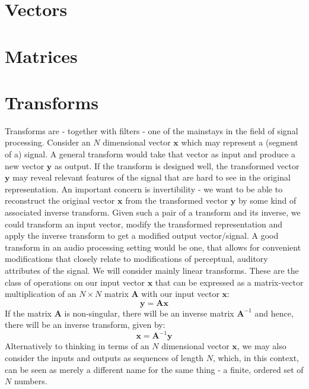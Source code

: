 \section{Vectors}
\section{Matrices}

\section{Transforms}
Transforms are - together with filters - one of the mainstays in the field of signal processing. Consider an $N$ dimensional vector $\mathbf{x}$ which may represent a (segment of a) signal. A general transform would take that vector as input and produce a new vector $\mathbf{y}$ as output. If the transform is designed well, the transformed vector $\mathbf{y}$ may reveal relevant features of the signal that are hard to see in the original representation. An important concern is invertibility - we want to be able to reconstruct the original vector $\mathbf{x}$ from the transformed vector $\mathbf{y}$ by some kind of associated inverse transform. Given such a pair of a transform and its inverse, we could transform an input vector, modify the transformed representation and apply the inverse transform to get a modified output vector/signal. A good transform in an audio processing setting would be one, that allows for convenient modifications that closely relate to modifications of perceptual, auditory attributes of the signal. We will consider mainly linear transforms. These are the class of operations on our input vector $\mathbf{x}$ that can be expressed as a matrix-vector multiplication of an  $N \times N$ matrix $\mathbf{A}$ with our input vector $\mathbf{x}$:
\begin{equation}
	\mathbf{y} = \mathbf{A} \mathbf{x}
\end{equation}
If the matrix $\mathbf{A}$ is non-singular, there will be an inverse matrix $\mathbf{A}^{-1}$ and hence, there will be an inverse transform, given by:
\begin{equation}
	\mathbf{x} = \mathbf{A}^{-1} \mathbf{y}
\end{equation}
Alternatively to thinking in terms of an $N$ dimensional vector $\mathbf{x}$, we may also consider the inputs and outputs as sequences of length $N$, which, in this context, can be seen as merely a different name for the same thing - a finite, ordered set of $N$ numbers.

